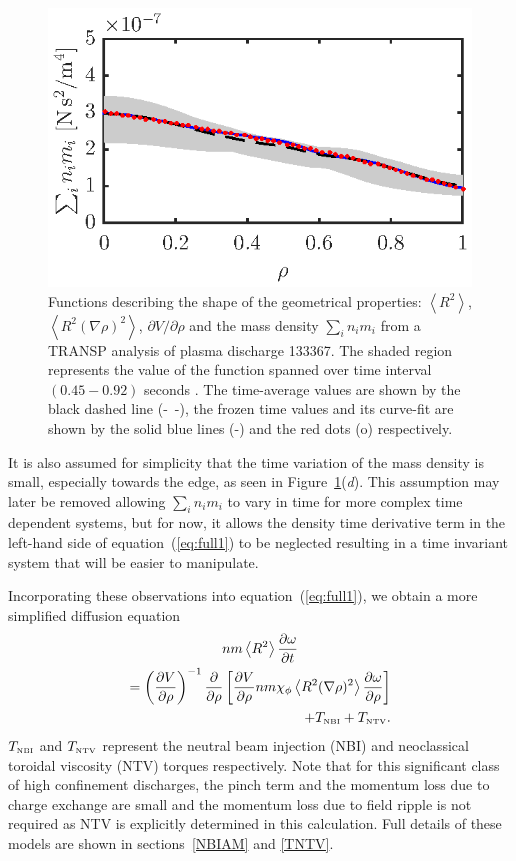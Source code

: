 \documentclass[12pt]{iopart}
\begin{document}
\begin{figure}
\includegraphics{imene_figs/fig1d} \hspace{-3em}
\caption{Functions describing the shape of the geometrical properties: $\left< R^2 \right>$, $\left< R^2 (\nabla\rho)^2 \right>$, $\partial V/\partial \rho$ and  the mass density $ \sum_i n_i m_i $ from a TRANSP analysis of plasma discharge 133367.  The shaded region represents the value of the function spanned over time interval $(0.45-0.92)$ seconds . The time-average values are shown by the black dashed line (-~-), the frozen time values and its curve-fit are shown by the solid blue lines (-) and the red dots (o) respectively.}
\label{fig:geofunc}
\end{figure}

It is also assumed for simplicity that the time variation of the mass density is small, especially towards the edge, as seen in Figure~{\ref{fig:geofunc}}(\emph{d}). 
 This assumption may later be removed allowing $ \sum_i n_i m_i $  to vary in time for more complex time dependent systems, but for now, it allows the density time derivative term in the left-hand side of equation~(\ref{eq:full1}) to be neglected resulting in a time invariant system that will be easier to manipulate.
 
 Incorporating these observations into equation~(\ref{eq:full1}), we obtain a more simplified diffusion equation
\begin{multline}
 n m \left<R^2\right>
 \frac{\partial \omega}{\partial t} \\
 = \left( \frac{\partial V}{\partial\rho}\right)^{-1}
   \frac{\partial}{\partial \rho} 
   \left[\frac{\partial V}{\partial \rho} n m \chi_\phi 
   \left< R^2 (\nabla \rho)^2\right> 
   \frac{\partial\omega}{\partial\rho}\right] \\
   \hfill + T_\textrm{\tiny NBI} + T_\textrm{\tiny NTV}.
		\label{model0}
\end{multline}
$T_\textrm{\tiny NBI} $ and $T_\textrm{\tiny NTV}$ represent the neutral beam injection (NBI) and neoclassical toroidal viscosity (NTV) torques respectively. Note that for this significant class of high confinement discharges, the pinch term and  the momentum loss due to charge exchange are small and the momentum loss due to  field ripple is not required as NTV is explicitly determined in this calculation. Full details of these models are shown in sections~\ref{NBIAM} and \ref{TNTV}.
  
\end{document}

